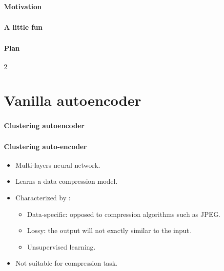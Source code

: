 \documentclass[xcolor=table]{beamer}
\subtitle[Autoencoders]{Autoencoders}
\begin{document}
\begin{frame}
\frametitle{\inserttitle}
\framesubtitle{Motivation}


\end{frame}

\begin{frame}
	\frametitle{\inserttitle}
	\framesubtitle{A little fun}
	
	
\end{frame}

\begin{frame}
\frametitle{\inserttitle}
\framesubtitle{Plan}

\begin{multicols}{2}
	\tableofcontents
\end{multicols}
\end{frame}


\section{Vanilla autoencoder}

\begin{frame}
	\frametitle{\inserttitle}
	\framesubtitle{Clustering autoencoder}
	
	
\end{frame}

\begin{frame}
\frametitle{\inserttitle}
\framesubtitle{Clustering auto-encoder}

\begin{itemize}
	\item Multi-layers neural network.
	\item Learns a data compression model.
	\item Characterized by \cite{2016-keras}:
	\begin{itemize}
		\item Data-specific: opposed to compression algorithms such as JPEG.
		\item Lossy: the output will not exactly similar to the input.
		\item Unsupervised learning. 
	\end{itemize}
	\item Not suitable for compression task.
\end{itemize}

\end{frame}
\end{document}

